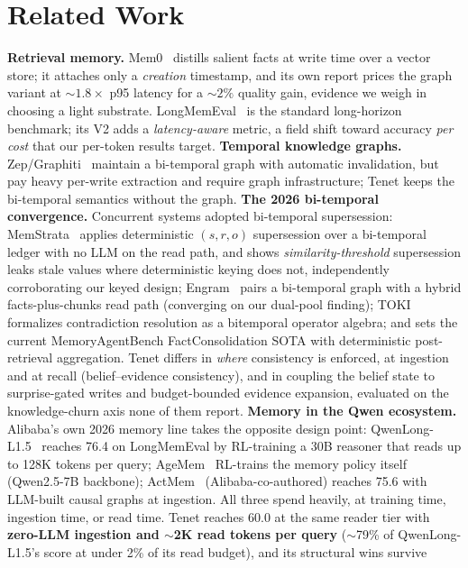 \documentclass[11pt]{article}
\begin{document}
\section{Related Work}
\textbf{Retrieval memory.} Mem0~\cite{mem0} distills salient facts at write time over a
vector store; it attaches only a \emph{creation} timestamp, and its own report prices the graph
variant at ${\sim}1.8\times$ p95 latency for a ${\sim}2\%$ quality gain, evidence we
weigh in choosing a light substrate. LongMemEval~\cite{longmemeval} is the standard
long-horizon benchmark; its V2 adds a \emph{latency-aware} metric, a field shift toward
accuracy \emph{per cost} that our per-token results target.
\textbf{Temporal knowledge graphs.} Zep/Graphiti~\cite{zep} maintain a bi-temporal graph
with automatic invalidation, but pay heavy per-write extraction
and require graph infrastructure; Tenet keeps the bi-temporal semantics without the graph.
\textbf{The 2026 bi-temporal convergence.} Concurrent systems adopted bi-temporal
supersession: MemStrata~\cite{memstrata} applies deterministic $(s,r,o)$ supersession over
a bi-temporal ledger with no LLM on the read path, and shows \emph{similarity-threshold}
supersession leaks stale values where deterministic keying does not, independently
corroborating our keyed design; Engram~\cite{engram} pairs a bi-temporal graph with a
hybrid facts-plus-chunks read path (converging on our dual-pool finding);
TOKI~\cite{toki} formalizes contradiction resolution as a bitemporal operator algebra;
and \cite{freshness} sets the current MemoryAgentBench FactConsolidation SOTA with
deterministic post-retrieval aggregation. Tenet differs in \emph{where} consistency is
enforced, at ingestion and at recall (belief--evidence consistency), and in coupling the
belief state to surprise-gated writes and budget-bounded evidence expansion, evaluated on
the knowledge-churn axis none of them report.
\textbf{Memory in the Qwen ecosystem.} Alibaba's own 2026 memory line takes the opposite
design point: QwenLong-L1.5~\cite{qwenlong} reaches 76.4 on LongMemEval by RL-training a
30B reasoner that reads up to 128K tokens per query; AgeMem~\cite{agemem} RL-trains the
memory policy itself (Qwen2.5-7B backbone); ActMem~\cite{actmem} (Alibaba-co-authored)
reaches 75.6 with LLM-built causal graphs at ingestion. All three spend heavily, at
training time, ingestion time, or read time. Tenet reaches 60.0 at the same reader tier
with \textbf{zero-LLM ingestion and $\sim$2K read tokens per query} ($\sim$79\% of
QwenLong-L1.5's score at under 2\% of its read budget), and its structural wins survive
\end{document}
